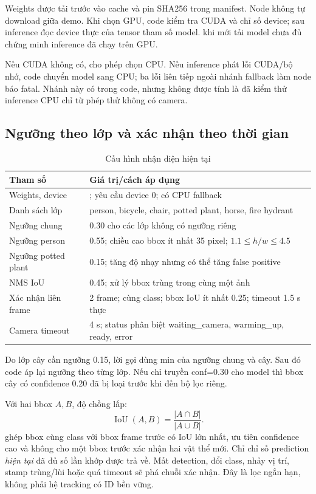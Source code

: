 Weights được tải trước vào cache và pin SHA256 trong manifest. Node không tự download giữa demo. Khi chọn GPU, code kiểm tra CUDA và chỉ số device; sau inference đọc device thực của tensor tham số model.  khi mới tải model chưa đủ chứng minh inference đã chạy trên GPU.

Nếu CUDA không có,  cho phép chọn CPU. Nếu inference phát lỗi CUDA/bộ nhớ, code chuyển model sang CPU; ba lỗi liên tiếp ngoài nhánh fallback làm node báo fatal. Nhánh này có trong code, nhưng không được tính là đã kiểm thử inference CPU chỉ từ phép thử không có camera.
\clearpage

\subsection{Ngưỡng theo lớp và xác nhận theo thời gian}
\begin{table}[H]\centering\small
\caption{Cấu hình nhận diện hiện tại}\label{tab:yolo}
\begin{tabularx}{\linewidth}{@{}P{5.1cm}Y@{}}\toprule
Tham số&Giá trị/cách áp dụng\\\midrule
Weights, device&; yêu cầu device 0; có CPU fallback\\
Danh sách lớp&person, bicycle, chair, potted plant, horse, fire hydrant\\
Ngưỡng chung&0.30 cho các lớp không có ngưỡng riêng\\
Ngưỡng person&0.55; chiều cao bbox ít nhất 35 pixel; $1.1\le h/w\le4.5$\\
Ngưỡng potted plant&0.15; tăng độ nhạy nhưng có thể tăng false positive\\
NMS IoU&0.45; xử lý bbox trùng trong cùng một ảnh\\
Xác nhận liên frame&2 frame; cùng class; bbox IoU ít nhất 0.25; timeout 1.5 s thực\\
Camera timeout&4 s; status phân biệt waiting\_camera, warming\_up, ready, error\\\bottomrule
\end{tabularx}\end{table}
Do lớp cây cần ngưỡng 0.15, lời gọi  dùng min của ngưỡng chung và cây. Sau đó code áp lại ngưỡng theo từng lớp. Nếu chỉ truyền conf=0.30 cho model thì bbox cây có confidence 0.20 đã bị loại trước khi đến bộ lọc riêng.

Với hai bbox $A,B$, độ chồng lấp:
\begin{equation}
\operatorname{IoU}(A,B)=\frac{|A\cap B|}{|A\cup B|}.
\end{equation}
 ghép bbox cùng class với bbox frame trước có IoU lớn nhất, ưu tiên confidence cao và không cho một bbox trước xác nhận hai vật thể mới. Chỉ chỉ số prediction \emph{hiện tại} đã đủ số lần khớp được trả về. Mất detection, đổi class, nhảy vị trí, stamp trùng/lùi hoặc quá timeout sẽ phá chuỗi xác nhận. Đây là lọc ngắn hạn, không phải hệ tracking có ID bền vững.

